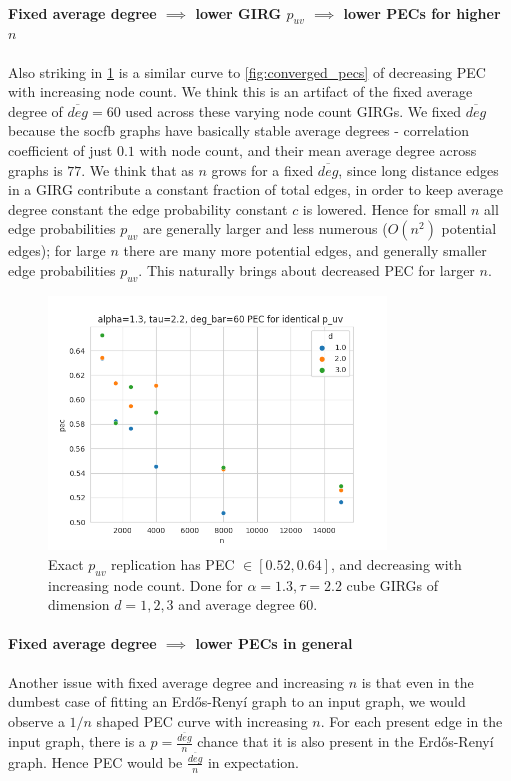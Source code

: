 \paragraph{Fixed average degree $\implies$ lower GIRG $p_{uv}$ $\implies$ lower PECs for higher $n$}
Also striking in \cref{fig:pec_girg_identical_puv} is a similar curve to \cref{fig:converged_pecs} of decreasing PEC with increasing node count. We think this is an artifact of the fixed average degree of $\overline{deg} = 60$ used across these varying node count GIRGs. We fixed $\overline{deg}$ because the socfb graphs have basically stable average degrees - correlation coefficient of just $0.1$ with node count, and their mean average degree across graphs is $77$. We think that as $n$ grows for a fixed $\overline{deg}$, since long distance edges in a GIRG contribute a constant fraction of total edges, in order to keep average degree constant the edge probability constant $c$ is lowered. Hence for  small $n$ all edge probabilities $p_{uv}$ are generally larger and less numerous ($O(n^2)$ potential edges); for large $n$ there are many more potential edges, and generally smaller edge probabilities $p_{uv}$. This naturally brings about decreased PEC for larger $n$.

\begin{figure}
  \includegraphics[width=0.8\textwidth]{./figures/pec_girg_identical_puv.png}
  \hfill
  \caption{Exact $p_{uv}$ replication has PEC $\in [0.52, 0.64]$, and decreasing with increasing node count. Done for $\alpha=1.3, \tau=2.2$ cube GIRGs of dimension $d=1,2,3$ and average degree $60$.}
  \label{fig:pec_girg_identical_puv}
\end{figure}

\paragraph{Fixed average degree $\implies$ lower PECs in general}
Another issue with fixed average degree and increasing $n$ is that even in the dumbest case of fitting an Erd\H{o}s-Reny{\'i} graph to an input graph, we would observe a $1/n$ shaped PEC curve with increasing $n$. For each present edge in the input graph, there is a $p = \frac{\overline{deg}}{n}$ chance that it is also present in the Erd\H{o}s-Reny{\'i} graph. Hence PEC would be $\frac{\overline{deg}}{n}$ in expectation.

